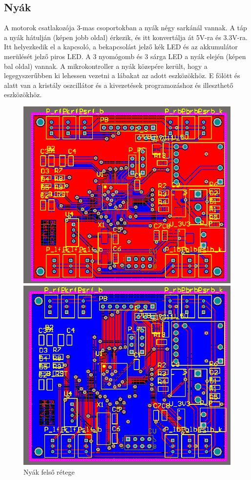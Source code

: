\documentclass{article}
\begin{document}
\subsection{Nyák}
A motorok csatlakozója 3-mas csoportokban a nyák négy sarkánál vannak. A táp a nyák hátulján (képen jobb oldal) érkezik, és itt konvertálja át 5V-ra és 3.3V-ra. Itt helyezkedik el a kapcsoló, a bekapcsolást jelző kék LED és az akkumulátor merülését jelző piros LED. A 3 nyomógomb és 3 sárga LED a nyák elején (képen bal oldal) vannak. A mikrokontroller a nyák közepére került, hogy a legegyszerűbben ki lehessen vezetni a lábakat az adott eszközökhöz. E fölött és alatt van a kristály oszcillátor és a kivezetések programozáshoz és illeszthető eszközökhöz.
\begin{figure}
\centering
	\begin{minipage}{0.3\textwidth}
		\centering
		\includegraphics[width=\textwidth]{nyakfelso}
		\caption{Nyák felső rétege}
	\end{minipage}\hfill
	\begin{minipage}{0.3\textwidth}
		\centering
		\includegraphics[width=\textwidth]{nyakalso}

\end{minipage}
\end{figure}
\end{document}

